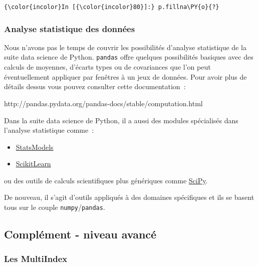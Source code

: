     \begin{Verbatim}[commandchars=\\\{\},frame=single,framerule=0.3mm,rulecolor=\color{cellframecolor}]
{\color{incolor}In [{\color{incolor}80}]:} p.fillna\PY{o}{?}
\end{Verbatim}


    \hypertarget{analyse-statistique-des-donnuxe9es}{%
\subsubsection{Analyse statistique des
données}\label{analyse-statistique-des-donnuxe9es}}

    Nous n'avons pas le temps de couvrir les possibilités d'analyse
statistique de la suite data science de Python. \texttt{pandas} offre
quelques possibilités basiques avec des calculs de moyennes, d'écarts
types ou de covariances que l'on peut éventuellement appliquer par
fenêtres à un jeux de données. Pour avoir plus de détails dessus vous
pouvez consulter cette documentation~:

http://pandas.pydata.org/pandas-docs/stable/computation.html

Dans la suite data science de Python, il a aussi des modules spécialisés
dans l'analyse statistique comme~:

\begin{itemize}
\tightlist
\item
  \href{http://www.statsmodels.org/stable/index.html}{StatsModels}
\item
  \href{http://scikit-learn.org/stable/}{ScikitLearn}
\end{itemize}

ou des outils de calculs scientifiques plus génériques comme
\href{https://www.scipy.org/}{SciPy}.

De nouveau, il s'agit d'outils appliqués à des domaines spécifiques et
ils se basent tous sur le couple \texttt{numpy}/\texttt{pandas}.

    \hypertarget{compluxe9ment---niveau-avancuxe9}{%
\subsection{Complément - niveau
avancé}\label{compluxe9ment---niveau-avancuxe9}}

    \hypertarget{les-multiindex}{%
\subsubsection{Les MultiIndex}\label{les-multiindex}}

